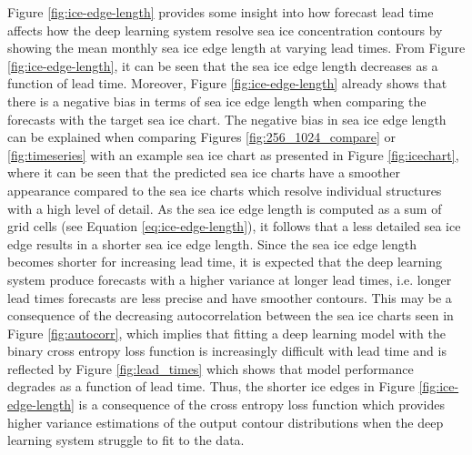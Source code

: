 \documentclass[../main/thesis]{subfiles}
\begin{document}
Figure \ref{fig:ice-edge-length} provides some insight into how forecast lead time affects how the deep learning system resolve sea ice concentration contours by showing the mean monthly sea ice edge length at varying lead times. From Figure \ref{fig:ice-edge-length}, it can be seen that the sea ice edge length decreases as a function of lead time. Moreover, Figure \ref{fig:ice-edge-length} already shows that there is a negative bias in terms of sea ice edge length when comparing the forecasts with the target sea ice chart. The negative bias in sea ice edge length can be explained when comparing Figures \ref{fig:256_1024_compare} or \ref{fig:timeseries} with an example sea ice chart as presented in Figure \ref{fig:icechart}, where it can be seen that the predicted sea ice charts have a smoother appearance compared to the sea ice charts which resolve individual structures with a high level of detail. As the sea ice edge length is computed as a sum of grid cells (see Equation \ref{eq:ice-edge-length}), it follows that a less detailed sea ice edge results in a shorter sea ice edge length. Since the sea ice edge length becomes shorter for increasing lead time, it is expected that the deep learning system produce forecasts with a higher variance at longer lead times, i.e. longer lead times forecasts are less precise and have smoother contours. This may be a consequence of the decreasing autocorrelation between the sea ice charts seen in Figure \ref{fig:autocorr}, which implies that fitting a deep learning model with the binary cross entropy loss function is increasingly difficult with lead time and is reflected by Figure \ref{fig:lead_times} which shows that model performance degrades as a function of lead time. Thus, the shorter ice edges in Figure \ref{fig:ice-edge-length} is a consequence of the cross entropy loss function which provides higher variance estimations of the output contour distributions when the deep learning system struggle to fit to the data.
\end{document}
